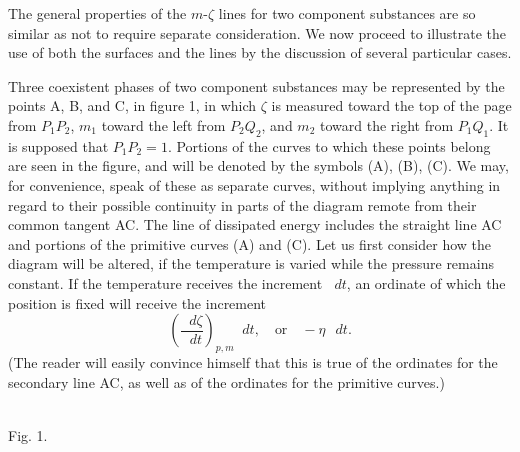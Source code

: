 \documentclass[11pt]{article}
\newcommand{\dd}{\mathop{}\!d}
\begin{document}
The general properties of the $m$-$\zeta$ lines for two component substances are so similar as not to require separate consideration. We now proceed to illustrate the use of both the surfaces and the lines by the discussion of several particular cases.

Three coexistent phases of two component substances may be represented by the points A, B, and C, in figure 1, in which $\zeta$ is measured toward the top of the page from $P_1P_2$, $m_1$ toward the left from $P_2Q_2$, and $m_2$ toward the right from $P_1Q_1$. It is supposed that $P_1P_2=1$. Portions of the curves to which these points belong are seen in the figure, and will be denoted by the symbols (A), (B), (C). We may, for convenience, speak of these as separate curves, without implying anything in regard to their possible continuity in parts of the diagram remote from their common tangent AC. The line of dissipated energy includes the straight line AC and portions of the primitive curves (A) and (C). Let us first consider how the diagram will be altered, if the temperature is varied while the pressure remains constant. If the temperature receives the increment $\dd t$, an ordinate of which the position is fixed will receive the increment
\[
\left(\frac{\dd\zeta}{\dd t}\right)_{p,m}\dd t,
\quad\text{or}\quad -\eta\,\dd t.
\]
(The reader will easily convince himself that this is true of the ordinates for the secondary line AC, as well as of the ordinates for the primitive curves.)

\begin{center}\label{fig:gibbs-v1-p3-fig1}
\\[-0.2em]
{\small Fig. 1.}
\end{center}
\end{document}
